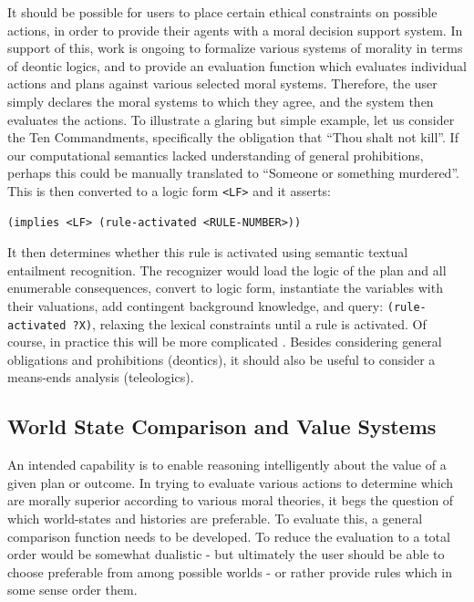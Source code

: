 \documentclass[letterpaper]{article}
\begin{document}
\noindent It should be possible for users to place certain ethical
constraints on possible actions, in order to provide their agents with
a moral decision support system.  In support of this, work is ongoing
to formalize various systems of morality in terms of deontic logics,
and to provide an evaluation function which evaluates individual
actions and plans against various selected moral systems.  Therefore,
the user simply declares the moral systems to which they agree, and
the system then evaluates the actions.  To illustrate a glaring but
simple example, let us consider the Ten Commandments, specifically the
obligation that ``Thou shalt not kill''.  If our computational
semantics lacked understanding of general prohibitions, perhaps this
could be manually translated to ``Someone or something murdered''.
This is then converted to a logic form {\tt <LF>} and it asserts:

\begin{footnotesize}
\begin{verbatim}
(implies <LF> (rule-activated <RULE-NUMBER>))
\end{verbatim}
\end{footnotesize}

\noindent It then determines whether this rule is activated using
semantic textual entailment recognition.  The recognizer would load
the logic of the plan and all enumerable consequences, convert to
logic form, instantiate the variables with their valuations, add
contingent background knowledge, and query: {\tt (rule-activated ?X)},
relaxing the lexical constraints until a rule is activated.  Of
course, in practice this will be more complicated
\cite{Balduccini06knowledgerepresentation}. Besides considering
general obligations and prohibitions (deontics), it should also be
useful to consider a means-ends analysis (teleologics).

\subsection{World State Comparison and Value Systems}

\noindent An intended capability is to enable reasoning intelligently
about the value of a given plan or outcome.  In trying to evaluate
various actions to determine which are morally superior according to
various moral theories, it begs the question of which world-states and
histories are preferable.  To evaluate this, a general comparison
function needs to be developed.  To reduce the evaluation to a total
order would be somewhat dualistic - but ultimately the user should be
able to choose preferable from among possible worlds - or rather
provide rules which in some sense order them.
\end{document}
